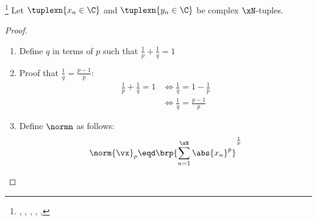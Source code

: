 \begin{theorem}
\footnote{
  ,
  ,
  ,
  ,
  ,
  }
\label{thm:lp_minkowski}
Let $\tuplexn{x_n\in\C}$ and $\tuplexn{y_n\in\C}$ be complex $\xN$-tuples.
\end{theorem}
\begin{proof}
\mbox{}\\
\begin{enumerate}
  \item Define $q$ in terms of $p$ such that $\frac{1}{p}+\frac{1}{q}=1$

  \item Proof that $\frac{1}{q} = \frac{p-1}{p}$:  \label{item:lp_minkowski_qp}
    \begin{align*}
      \frac{1}{p}+\frac{1}{q}=1
        &\iff \frac{1}{q} = 1-\frac{1}{p}
      \\&\iff \frac{1}{q} = \frac{p-1}{p}
    \end{align*}

  \item Define $\normn$ as follows:
    \[ \norm{\vx}_p \eqd \brp{\sum_{n=1}^{\xN} \abs{x_n}^p}^\frac{1}{p} \]


\end{enumerate}
\end{proof}
